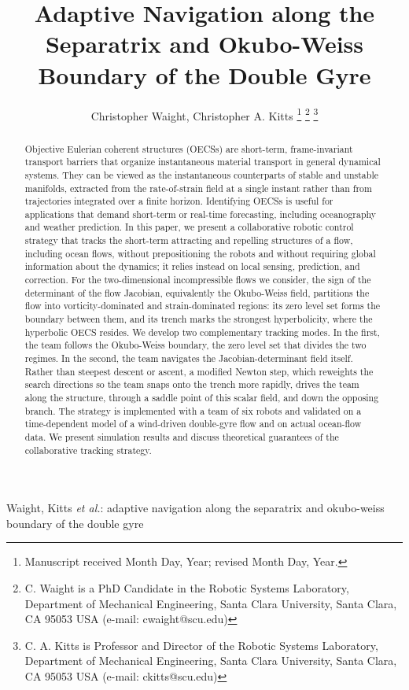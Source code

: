\documentclass[lettersize,journal]{IEEEtran}
\begin{document}
\title{Adaptive Navigation along the Separatrix and Okubo-Weiss Boundary of the Double Gyre}

\author{Christopher Waight, Christopher A. Kitts 
\thanks{Manuscript received Month Day, Year; revised Month Day, Year.}
\thanks{C. Waight is a PhD Candidate in the Robotic Systems Laboratory, Department of Mechanical
Engineering, Santa Clara University, Santa Clara, CA 95053 USA (e-mail: cwaight@scu.edu)}
\thanks{C. A. Kitts is Professor and Director of the Robotic Systems Laboratory, Department of
Mechanical Engineering, Santa Clara University, Santa Clara, CA 95053 USA (e-mail: ckitts@scu.edu)}
}
%
{Waight, Kitts \MakeLowercase{\textit{et al.}: Adaptive Navigation along the Separatrix and Okubo-Weiss Boundary of the Double Gyre}}

\maketitle

\begin{abstract}
Objective Eulerian coherent structures (OECSs) are short-term,
frame-invariant transport barriers that organize instantaneous material
transport in general dynamical systems. They can be viewed as the
instantaneous counterparts of stable and unstable manifolds, extracted
from the rate-of-strain field at a single instant rather than from
trajectories integrated over a finite horizon. Identifying OECSs is
useful for applications that demand short-term or real-time forecasting,
including oceanography and weather prediction. In this paper, we present
a collaborative robotic control strategy that tracks the short-term
attracting and repelling structures of a flow, including ocean flows,
without prepositioning the robots and without requiring global
information about the dynamics; it relies instead on local sensing,
prediction, and correction. For the two-dimensional incompressible flows
we consider, the sign of the determinant of the flow Jacobian,
equivalently the Okubo-Weiss field, partitions the flow into
vorticity-dominated and strain-dominated regions: its zero level set
forms the boundary between them, and its trench marks the strongest
hyperbolicity, where the hyperbolic OECS resides. We develop two
complementary tracking modes. In the first, the team follows the
Okubo-Weiss boundary, the zero level set that divides the two regimes.
In the second, the team navigates the Jacobian-determinant field itself.
Rather than steepest descent or ascent, a modified Newton step, which
reweights the search directions so the team snaps onto the trench more
rapidly, drives the team along the structure, through a saddle point of
this scalar field, and down the opposing branch. The strategy is
implemented with a team of six robots and validated on a time-dependent
model of a wind-driven double-gyre flow and on actual ocean-flow data.
We present simulation results and discuss theoretical guarantees of the
collaborative tracking strategy.
\end{abstract}
\end{document}

